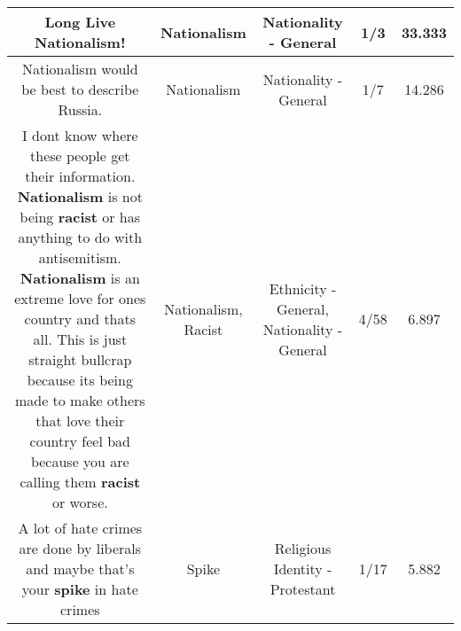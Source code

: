 \documentclass[11pt]{article}
\newlength\mylength
\begin{document}
\begin{center}
\begin{longtable}{|C{.65\mylength}|C{.30\mylength}|C{.12\mylength}|C{.12\mylength}|C{.12\mylength}|}
  \small Long Live \textbf{Nationalism}!\normalsize   & Nationalism & Nationality - General & 1/3 & 33.333 \\  \hline
  \small Nationalism would be best to describe Russia.\normalsize   & Nationalism & Nationality - General & 1/7 & 14.286 \\  \hline
  \small I dont know where these people get their information. \textbf{Nationalism} is not being \textbf{racist} or has anything to do with antisemitism. \textbf{Nationalism} is an extreme love for ones country and thats all. This is just straight bullcrap because its being made to make others that love their country feel bad because you are calling them \textbf{racist} or worse.\normalsize   & Nationalism, Racist & Ethnicity - General, Nationality - General & 4/58 & 6.897 \\  \hline
  \small A lot of hate crimes are done by liberals and maybe that's your \textbf{spike} in hate crimes\normalsize   & Spike & Religious Identity - Protestant & 1/17 & 5.882 \\  \hline

\end{longtable}
\end{center}
\end{document}
